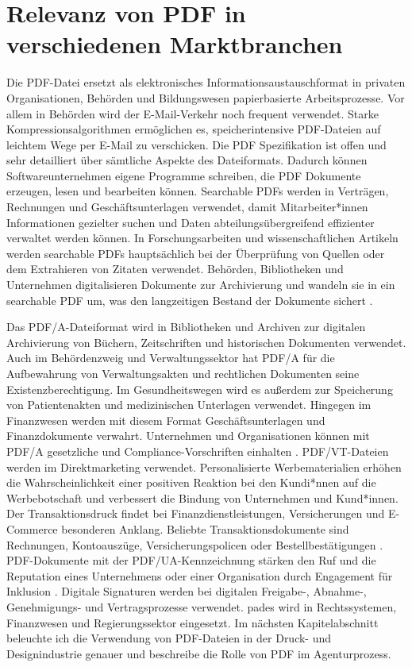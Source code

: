 \section{Relevanz von PDF in verschiedenen Marktbranchen}
Die PDF-Datei ersetzt als elektronisches Informationsaustauschformat in privaten Organisationen, Behörden und Bildungswesen papierbasierte Arbeitsprozesse. Vor allem in Behörden wird der E-Mail-Verkehr noch frequent verwendet. Starke Kompressionsalgorithmen ermöglichen es, speicherintensive PDF-Dateien auf leichtem Wege per E-Mail zu verschicken. Die PDF Spezifikation ist offen und sehr detailliert über sämtliche Aspekte des Dateiformats. Dadurch können Softwareunternehmen eigene Programme schreiben, die PDF Dokumente erzeugen, lesen und bearbeiten können. Searchable PDFs werden in Verträgen, Rechnungen und Geschäftsunterlagen verwendet, damit Mitarbeiter*innen Informationen gezielter suchen und Daten abteilungsübergreifend effizienter verwaltet werden können. In Forschungsarbeiten und wissenschaftlichen Artikeln werden searchable PDFs hauptsächlich bei der Überprüfung von Quellen oder dem Extrahieren von Zitaten verwendet. Behörden, Bibliotheken und Unternehmen digitalisieren Dokumente zur Archivierung und wandeln sie in ein searchable PDF um, was den langzeitigen Bestand der Dokumente sichert \cite{adobe-search}.
\par
Das PDF/A-Dateiformat wird in Bibliotheken und Archiven zur digitalen Archivierung von Büchern, Zeitschriften und historischen Dokumenten verwendet. Auch im Behördenzweig und Verwaltungssektor hat PDF/A für die Aufbewahrung von Verwaltungsakten und rechtlichen Dokumenten seine Existenzberechtigung. Im Gesundheitswegen wird es außerdem zur Speicherung von Patientenakten und medizinischen Unterlagen verwendet. Hingegen im Finanzwesen werden mit diesem Format Geschäftsunterlagen und Finanzdokumente verwahrt. Unternehmen und Organisationen können mit PDF/A gesetzliche und Compliance-Vorschriften einhalten \cite{adobe-pdf-a}. PDF/VT-Dateien werden im Direktmarketing verwendet. Personalisierte Werbematerialien erhöhen die Wahrscheinlichkeit einer positiven Reaktion bei den Kundi*nnen auf die Werbebotschaft und verbessert die Bindung von Unternehmen und Kund*innen. Der Transaktionsdruck findet bei Finanzdienstleistungen, Versicherungen und E-Commerce besonderen Anklang. Beliebte Transaktionsdokumente sind Rechnungen, Kontoauszüge, Versicherungspolicen oder Bestellbestätigungen \cite{adobe-pdf-vt}. PDF-Dokumente mit der PDF/UA-Kennzeichnung stärken den Ruf und die Reputation eines Unternehmens oder einer Organisation durch Engagement für Inklusion \cite{adobe-pdf-ua}. Digitale Signaturen werden bei digitalen Freigabe-, Abnahme-, Genehmigungs- und Vertragsprozesse verwendet. \gls{pades} wird in Rechtssystemen, Finanzwesen und Regierungssektor eingesetzt\cite{adobe-pdf-pades}. Im nächsten Kapitelabschnitt beleuchte ich die Verwendung von PDF-Dateien in der Druck- und Designindustrie genauer und beschreibe die Rolle von PDF im Agenturprozess.  